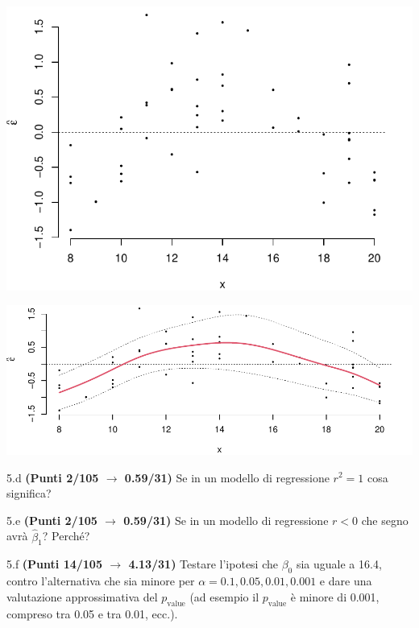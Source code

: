 \documentclass[
  11pt,
]{book}
\theoremstyle{mytheoremstyle}
\theoremstyle{mydefstyle}
\newenvironment{sol}
  {
  \begin{tcolorbox}[enhanced,breakable,arc=0.1mm,boxrule=1pt,colback=white,colframe=iblue,
  title=\bf \fontfamily{lmss}\selectfont \hspace{.5 cm} Soluzione,drop fuzzy shadow]

}{
\end{tcolorbox}
  }
\begin{document}
\begin{center}\includegraphics{Esami_passati_con_soluzioni_files/figure-latex/2024-19,-1} \end{center}

\begin{sol}

\begin{center}\includegraphics{Esami_passati_con_soluzioni_files/figure-latex/2024-20,-1} \end{center}

\end{sol}

5.d \textbf{(Punti 2/105 \(\rightarrow\) 0.59/31)} Se in un modello di regressione \(r^2=1\) cosa significa?

5.e \textbf{(Punti 2/105 \(\rightarrow\) 0.59/31)} Se in un modello di regressione \(r<0\) che segno avrà \(\hat\beta_1\)? Perché?

5.f \textbf{(Punti 14/105 \(\rightarrow\) 4.13/31)} Testare l'ipotesi che \(\beta_0\) sia uguale a 16.4, contro l'alternativa che sia minore per \(\alpha=0.1,0.05,0.01,0.001\) e dare una valutazione approssimativa del \(p_\text{value}\) (ad esempio il \(p_\text{value}\) è minore di 0.001, compreso tra 0.05 e tra 0.01, ecc.).
\end{document}
